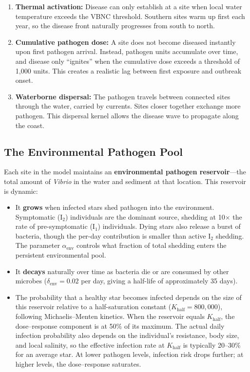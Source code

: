\documentclass[11pt]{article}
\begin{document}
\begin{enumerate}[leftmargin=2em]
    \item \textbf{Thermal activation:} Disease can only establish at a site when local water temperature exceeds the VBNC threshold. Southern sites warm up first each year, so the disease front naturally progresses from south to north.

    \item \textbf{Cumulative pathogen dose:} A site does not become diseased instantly upon first pathogen arrival. Instead, pathogen units accumulate over time, and disease only ``ignites'' when the cumulative dose exceeds a threshold of 1,000 units. This creates a realistic lag between first exposure and outbreak onset.

    \item \textbf{Waterborne dispersal:} The pathogen travels between connected sites through the water, carried by currents. Sites closer together exchange more pathogen. This dispersal kernel allows the disease wave to propagate along the coast.
\end{enumerate}

\subsection*{The Environmental Pathogen Pool}

Each site in the model maintains an \textbf{environmental pathogen reservoir}---the total amount of \textit{Vibrio} in the water and sediment at that location. This reservoir is dynamic:

\begin{itemize}[leftmargin=2em]
    \item It \textbf{grows} when infected stars shed pathogen into the environment. Symptomatic (I$_2$) individuals are the dominant source, shedding at 10$\times$ the rate of pre-symptomatic (I$_1$) individuals. Dying stars also release a burst of bacteria, though the per-day contribution is smaller than active I$_2$ shedding. The parameter $\alpha_{\text{env}}$ controls what fraction of total shedding enters the persistent environmental pool.
    \item It \textbf{decays} naturally over time as bacteria die or are consumed by other microbes ($\delta_{\text{env}} = 0.02$ per day, giving a half-life of approximately 35 days).
    \item The probability that a healthy star becomes infected depends on the size of this reservoir relative to a half-saturation constant ($K_{\text{half}} = 800{,}000$), following Michaelis--Menten kinetics. When the reservoir equals $K_{\text{half}}$, the dose--response component is at 50\% of its maximum. The actual daily infection probability also depends on the individual's resistance, body size, and local salinity, so the effective infection rate at $K_{\text{half}}$ is typically 20--30\% for an average star. At lower pathogen levels, infection risk drops further; at higher levels, the dose--response saturates.
\end{itemize}
\end{document}
